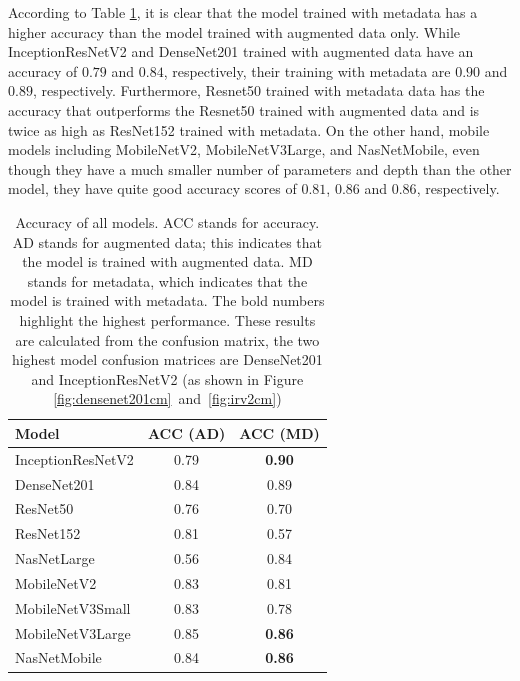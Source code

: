 \documentclass[sensors,article,accept,pdftex,moreauthors]{Definitions/mdpi}
\begin{document}
	According to Table \ref{table:overall-acc}, it is clear that the model trained with metadata has a higher accuracy than the model trained with augmented data only. While InceptionResNetV2 and DenseNet201 trained with augmented data have an accuracy of $0.79$ and $0.84$, respectively, their training with metadata are $0.90$ and $0.89$, respectively. Furthermore, Resnet50 trained with metadata data has the accuracy that outperforms the Resnet50 trained with augmented data and is twice as high as ResNet152 trained with metadata. On the other hand, mobile models including MobileNetV2, MobileNetV3Large, and NasNetMobile, even though they have a much smaller number of parameters and depth than the other model, they have quite good accuracy scores of $0.81$, $0.86$ and $0.86$, respectively. 
	
	\begin{table}[H]
		\caption{Accuracy of all models. ACC stands for accuracy. AD stands for augmented data; this indicates that the model is trained with augmented data. MD stands for metadata, which indicates that the model is trained with metadata. The bold numbers highlight the highest performance. These results are calculated from the confusion matrix, the two highest model confusion matrices are DenseNet201 and InceptionResNetV2 (as shown in Figure {\mbox{\ref{fig:densenet201cm} and \ref{fig:irv2cm}}})}
		\label{table:overall-acc}
		\setlength{\tabcolsep}{12.38mm}\begin{tabular}{ l  c  c  }
\toprule
\textbf{Model} & \textbf{ACC (AD)} & \textbf{ACC (MD)}\\ 
\midrule
InceptionResNetV2 & 0.79 & \textbf{{0.90} %
}\\
\midrule
DenseNet201 & 0.84 & 0.89\\
\midrule
ResNet50 & 0.76 & 0.70\\
\midrule
ResNet152 & 0.81 & 0.57\\
\midrule
NasNetLarge & 0.56 & 0.84\\
\midrule
MobileNetV2 & 0.83 & 0.81\\
\midrule
MobileNetV3Small & 0.83 & 0.78\\
\midrule
MobileNetV3Large & 0.85 & \textbf{0.86}\\
\midrule
NasNetMobile & 0.84 & \textbf{0.86}\\
\bottomrule
		\end{tabular}
	\end{table}
	
\end{document}
